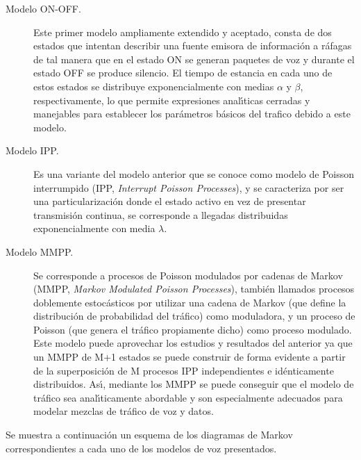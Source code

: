\begin{description} 
\item[Modelo ON-OFF.] 
Este primer modelo ampliamente extendido y aceptado, consta de dos estados 
que intentan describir una fuente emisora de informaci\'on a r\'afagas de tal  
manera que en el estado ON se generan paquetes de voz y durante el estado OFF 
se produce silencio. El tiempo de estancia en cada uno de estos estados se  
distribuye exponencialmente con medias $\alpha$ y $\beta$, respectivamente, lo  
que permite expresiones anal\'{\i}ticas cerradas y manejables para establecer 
los par\'ametros b\'asicos del trafico debido a este modelo. 
 
\item[Modelo IPP.] 
Es una variante del modelo anterior que se conoce como modelo de Poisson  
interrumpido (IPP, {\em Interrupt Poisson Processes}), y se caracteriza por ser 
una particularizaci\'on donde el estado activo en vez de presentar transmisi\'on 
continua, se corresponde a llegadas distribuidas exponencialmente con media $\lambda$. 
 
\item[Modelo MMPP.] 
Se corresponde a procesos de Poisson modulados por cadenas de Markov  
(MMPP, {\em Markov Modulated Poisson Processes}),  
tambi\'en llamados procesos doblemente estoc\'asticos por utilizar 
una cadena de Markov (que define la distribuci\'on de probabilidad del  
tr\'afico) como moduladora, y un proceso de Poisson (que genera el tr\'afico 
propiamente dicho) como proceso modulado. 
Este modelo puede aprovechar los estudios y resultados del anterior ya que un  
MMPP de M+1 estados se puede construir de forma evidente a partir de la  
superposici\'on de M procesos IPP independientes e id\'enticamente 
distribuidos. As\'{\i}, mediante los MMPP se puede conseguir que el modelo  
de tr\'afico sea anal\'{\i}ticamente abordable y son especialmente adecuados 
para modelar mezclas de tr\'afico de voz y datos. 
 
\end{description} 
 

Se muestra a continuaci\'on un esquema de los diagramas de Markov correspondientes
a cada uno de los modelos de voz presentados.




